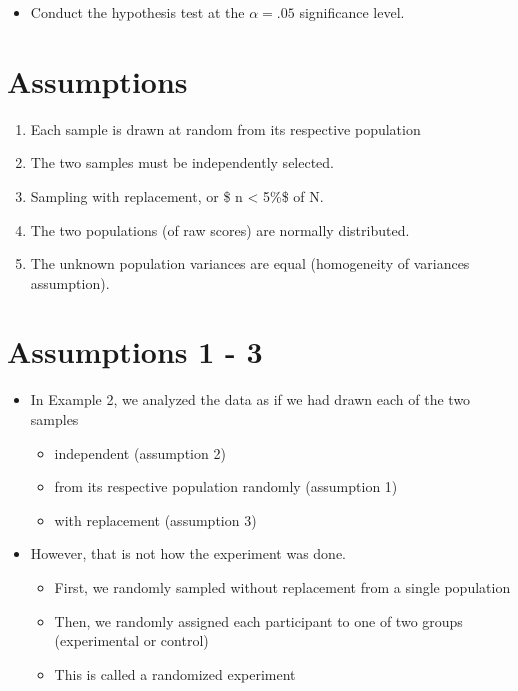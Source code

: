 \documentclass[12pt]{article}
\begin{document}
\begin{itemize}
\itemsep1pt\parskip0pt
\item
  Conduct the hypothesis test at the \(\alpha = .05\) significance
  level.
\end{itemize}

\section{Assumptions}\label{assumptions}

\begin{enumerate}
\def\labelenumi{\arabic{enumi}.}
\itemsep1pt\parskip0pt
\item
  Each sample is drawn at random from its respective population
\item
  The two samples must be independently selected.
\item
  Sampling with replacement, or \$ n \textless{} 5\%\$ of N.
\item
  The two populations (of raw scores) are normally distributed.
\item
  The unknown population variances are equal (homogeneity of variances
  assumption).
\end{enumerate}

\section{Assumptions 1 - 3}\label{assumptions-1---3}

\begin{itemize}
\itemsep1pt\parskip0pt
\item
  In Example 2, we analyzed the data as if we had drawn each of the two
  samples

  \begin{itemize}
  \itemsep1pt\parskip0pt
  \item
    independent (assumption 2)
  \item
    from its respective population randomly (assumption 1)
  \item
    with replacement (assumption 3)
  \end{itemize}
\item
  However, that is not how the experiment was done.

  \begin{itemize}
  \itemsep1pt\parskip0pt
  \item
    First, we randomly sampled without replacement from a single
    population
  \item
    Then, we randomly assigned each participant to one of two groups
    (experimental or control)
  \item
    This is called a randomized experiment
  \end{itemize}
\end{itemize}
\end{document}
